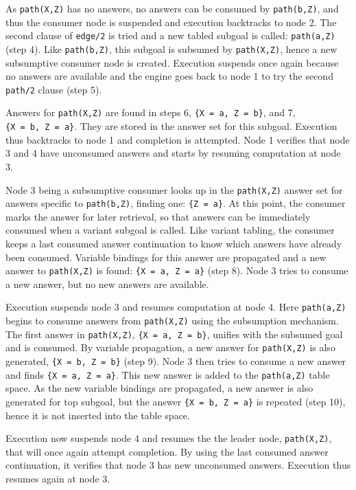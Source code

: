 As \texttt{path(X,Z)} has no answers, no answers can be consumed by \texttt{path(b,Z)}, and thus the consumer
node is suspended and execution backtracks to node 2. The second clause of \texttt{edge/2} is tried and a new tabled
subgoal is called: \texttt{path(a,Z)} (step 4). Like \texttt{path(b,Z)}, this subgoal is subsumed by \texttt{path(X,Z)},
hence a new subsumptive consumer node is created. Execution suspends once again because no answers are available and
the engine goes back to node 1 to try the second \texttt{path/2} clause (step 5).

Answers for \texttt{path(X,Z)} are found in steps 6, \texttt{\{X~=~a,~Z~=~b\}}, and 7, \texttt{\{X~=~b,~Z~=~a\}}.
They are stored in the answer set for this subgoal. Execution thus backtracks to node 1 and completion
is attempted. Node 1 verifies that node 3 and 4 have unconsumed answers and starts by resuming computation at node 3.

Node 3 being a subsumptive consumer looks up in the \texttt{path(X,Z)} answer set for answers specific to \texttt{path(b,Z)},
finding one: \texttt{\{Z~=~a\}}. At this point, the consumer marks the answer for later retrieval, so that answers can be
immediately consumed when a variant subgoal is called. Like variant tabling, the consumer keeps a last consumed answer
continuation to know which answers have already been consumed. Variable bindings for this answer are propagated and a
new answer to \texttt{path(X,Z)} is found: \texttt{\{X~=~a,~Z~=~a\}} (step 8). Node 3 tries to consume a new answer, but no
new answers are available.

Execution suspends node 3 and resumes computation at node 4. Here \texttt{path(a,Z)} begins to consume answers from
\texttt{path(X,Z)} using the subsumption mechanism. The first answer in \texttt{path(X,Z)}, \texttt{\{X~=~a,~Z~=~b\}},
unifies with the subsumed goal and is consumed. By variable propagation, a new answer for \texttt{path(X,Z)} is also
generated, \texttt{\{X~=~b,~Z~=~b\}} (step 9). Node 3 then tries to consume a new answer and finds \texttt{\{X~=~a,~Z~=~a\}}.
This new answer is added to the \texttt{path(a,Z)} table space. As the new variable bindings are propagated, a new
answer is also generated for top subgoal, but the answer \texttt{\{X~=~b,~Z~=~a\}} is repeated (step 10), hence it
is not inserted into the table space.

Execution now suspends node 4 and resumes the the leader node, \texttt{path(X,Z)}, that will once
again attempt completion. By using the last consumed answer continuation, it verifies that node 3 has
new unconsumed answers. Execution thus resumes again at node 3.

